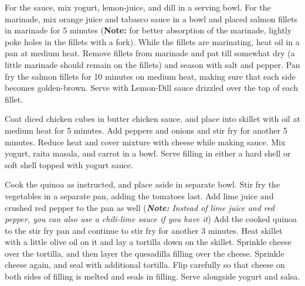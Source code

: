 \documentclass[oneside]{recipe}
\begin{document}
For the sauce, mix yogurt, lemon-juice, and dill in a serving bowl. For the marinade, mix orange juice and tabasco sauce in a bowl and placed salmon fillets in marinade for 5 minutes (\textbf{Note:} for better absorption of the marinade, lightly poke holes in the fillets with a fork). While the fillets are marinating, heat oil in a pan at medium heat. Remove fillets from marinade and pat till somewhat dry (a little marinade should remain on the fillets) and season with salt and pepper. Pan fry the salmon fillets for 10 minutes on medium heat, making sure that each side becomes golden-brown. Serve with Lemon-Dill sauce drizzled over the top of each fillet.


Coat diced chicken cubes in butter chicken sauce, and place into skillet with oil at medium heat for 5 minutes. Add peppers and onions and stir fry for another 5 minutes. Reduce heat and cover mixture with cheese while making sauce.
Mix yogurt, raita masala, and carrot in a bowl. Serve filling in either a hard shell or soft shell topped with yogurt sauce. 


Cook the quinoa as instructed, and place aside in separate bowl. Stir fry the vegetables in a separate pan, adding the tomatoes last. Add lime juice and crushed red pepper to the pan as well (\textit{\textbf{Note: } Instead of lime juice and red pepper, you can also use a chili-lime sauce if you have it}) Add the cooked quinoa to the stir fry pan and continue to stir fry for another 3 minutes. Heat skillet with a little olive oil on it and lay a tortilla down on the skillet. Sprinkle cheese over the tortilla, and then layer the quesadilla filling over the cheese. Sprinkle cheese again, and seal with additional tortilla. Flip carefully so that cheese on both sides of filling is melted and seals in filling. Serve alongside yogurt and salsa. 

\end{document}
